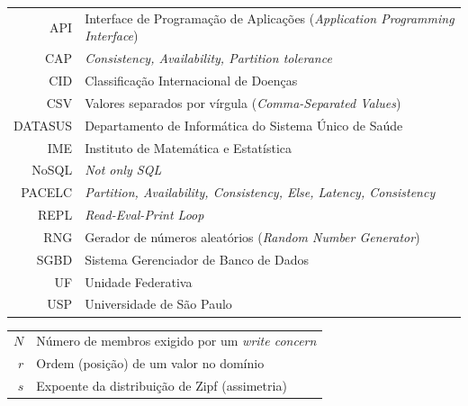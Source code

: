 \documentclass[a4paper,12pt,twoside,english,brazilian]{book}
\begin{document}
\begin{tabular}{rl}
      API & Interface de Programação de Aplicações (\emph{Application Programming Interface})\\
      CAP & \emph{Consistency, Availability, Partition tolerance}\\
      CID & Classificação Internacional de Doenças\\
      CSV & Valores separados por vírgula (\emph{Comma-Separated Values})\\
  DATASUS & Departamento de Informática do Sistema Único de Saúde\\
      IME & Instituto de Matemática e Estatística\\
    NoSQL & \emph{Not only SQL}\\
   PACELC & \emph{Partition, Availability, Consistency, Else, Latency, Consistency}\\
     REPL & \emph{Read-Eval-Print Loop}\\
      RNG & Gerador de números aleatórios (\emph{Random Number Generator})\\
     SGBD & Sistema Gerenciador de Banco de Dados\\
       UF & Unidade Federativa\\
      USP & Universidade de São Paulo
\end{tabular}


\begin{tabular}{rl}
  $N$ & Número de membros exigido por um \emph{write concern}\\
  $r$ & Ordem (posição) de um valor no domínio\\
  $s$ & Expoente da distribuição de Zipf (assimetria)\\
\end{tabular}

\clearpage


\disablenewpage{\listoffigures}
\end{document}
